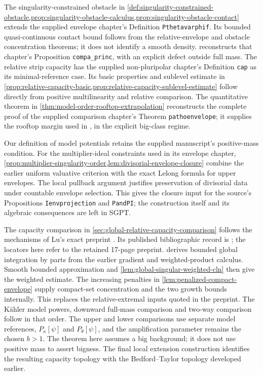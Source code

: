 The singularity-constrained obstacle in \cref{def:singularity-constrained-obstacle,prop:singularity-obstacle-calculus,prop:singularity-obstacle-contact} extends the supplied envelope chapter's Definition \texttt{Pthetavarphif}. Its bounded quasi-continuous contact bound follows from the relative-envelope and obstacle concentration theorems; it does not identify a smooth density.  reconstructs that chapter's Proposition \texttt{compa\_princ}, with an explicit defect outside full mass. The relative strip capacity has the supplied non-pluripolar chapter's Definition \texttt{cap} as its minimal-reference case. Its basic properties and sublevel estimate in \cref{prop:relative-capacity-basic,prop:relative-capacity-sublevel-estimate} follow directly from positive multilinearity and relative comparison. The quantitative theorem in \cref{thm:model-order-rooftop-extrapolation} reconstructs the complete proof of the supplied comparison chapter's Theorem \texttt{pathoenvelope}; it supplies the rooftop margin used in \cite[Theorem \texttt{rooftop}]{VuXiaNakamaye}, in the explicit big-class regime.

Our definition of model potentials retains the supplied manuscript's positive-mass condition. For the multiplier-ideal constraints used in its envelope chapter, \cref{prop:multiplier-singularity-order,lem:divisorial-envelope-closure} combine the earlier uniform valuative criterion with the exact Lelong formula for upper envelopes. The local pullback argument justifies preservation of divisorial data under countable envelope selection. This gives the closure input for the source's Propositions \texttt{Ienvprojection} and \texttt{PandPI}; the construction itself and its algebraic consequences are left in SGPT.

The capacity comparison in \cref{sec:global-relative-capacity-comparison} follows the mechanisms of Lu's exact preprint \cite[Lemmas 3.1--3.4 and Theorem 3.5, pp.~8--13]{Lu2020v1}. Its published bibliographic record is \cite{Lu21}; the locators here refer to the retained 17-page preprint.  derives bounded global integration by parts from the earlier gradient and weighted-product calculus. Smooth bounded approximation and \cref{lem:global-singular-weighted-cln} then give the weighted estimate. The increasing penalties in \cref{lem:penalized-compact-envelope} supply compact-set concentration and the two growth bounds internally. This replaces the relative-extremal inputs quoted in the preprint. The K\"ahler model powers, downward full-mass comparison and two-way comparison follow in that order. The upper and lower comparisons use separate model references, $P_\kappa[\psi]$ and $P_\theta[\psi]$, and the amplification parameter remains the chosen $b>1$. The theorem here assumes a big background; it does not use positive mass to assert bigness. The final local extension construction identifies the resulting capacity topology with the Bedford--Taylor topology developed earlier.

